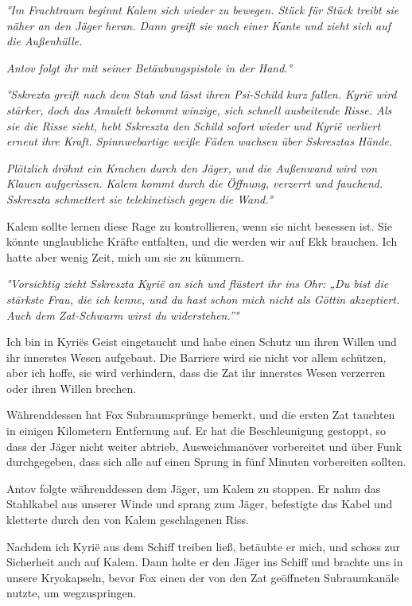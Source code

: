 \documentclass[11pt]{scrartcl}
\begin{document}
\emph{°Im Frachtraum beginnt Kalem sich wieder zu bewegen. Stück für
Stück treibt sie näher an den Jäger heran. Dann greift sie nach einer
Kante und zieht sich auf die Außenhülle.}

\emph{Antov folgt ihr mit seiner Betäubungspistole in der Hand.°}

\emph{°Sskrezta greift nach dem Stab und lässt ihren Psi-Schild kurz
fallen. Kyrië wird stärker, doch das Amulett bekommt winzige, sich
schnell ausbeitende Risse. Als sie die Risse sieht, hebt Sskreszta den
Schild sofort wieder und Kyrië verliert erneut ihre Kraft.
Spinnwebartige weiße Fäden wachsen über Sskresztas Hände.}

\emph{Plötzlich dröhnt ein Krachen durch den Jäger, und die Außenwand
wird von Klauen aufgerissen. Kalem kommt durch die Öffnung, verzerrt und
fauchend. Sskreszta schmettert sie telekinetisch gegen die Wand.°}

Kalem sollte lernen diese Rage zu kontrollieren, wenn sie nicht besessen
ist. Sie könnte unglaubliche Kräfte entfalten, und die werden wir auf
Ekk brauchen. Ich hatte aber wenig Zeit, mich um sie zu kümmern.

\emph{°Vorsichtig zieht Sskreszta Kyrië an sich und flüstert ihr ins
Ohr: „Du bist die stärkste Frau, die ich kenne, und du hast schon mich
nicht als Göttin akzeptiert. Auch dem Zat-Schwarm wirst du
widerstehen.''°}

Ich bin in Kyriës Geist eingetaucht und habe einen Schutz um ihren
Willen und ihr innerstes Wesen aufgebaut. Die Barriere wird sie nicht
vor allem schützen, aber ich hoffe, sie wird verhindern, dass die Zat
ihr innerstes Wesen verzerren oder ihren Willen brechen.

Währenddessen hat Fox Subraumsprünge bemerkt, und die ersten Zat
tauchten in einigen Kilometern Entfernung auf. Er hat die Beschleunigung
gestoppt, so dass der Jäger nicht weiter abtrieb, Ausweichmanöver
vorbereitet und über Funk durchgegeben, dass sich alle auf einen Sprung
in fünf Minuten vorbereiten sollten.

Antov folgte währenddessen dem Jäger, um Kalem zu stoppen. Er nahm das
Stahlkabel aus unserer Winde und sprang zum Jäger, befestigte das Kabel
und kletterte durch den von Kalem geschlagenen Riss.

Nachdem ich Kyrië aus dem Schiff treiben ließ, betäubte er mich, und
schoss zur Sicherheit auch auf Kalem. Dann holte er den Jäger ins Schiff
und brachte uns in unsere Kryokapseln, bevor Fox einen der von den Zat
geöffneten Subraumkanäle nutzte, um wegzuspringen.
\end{document}
